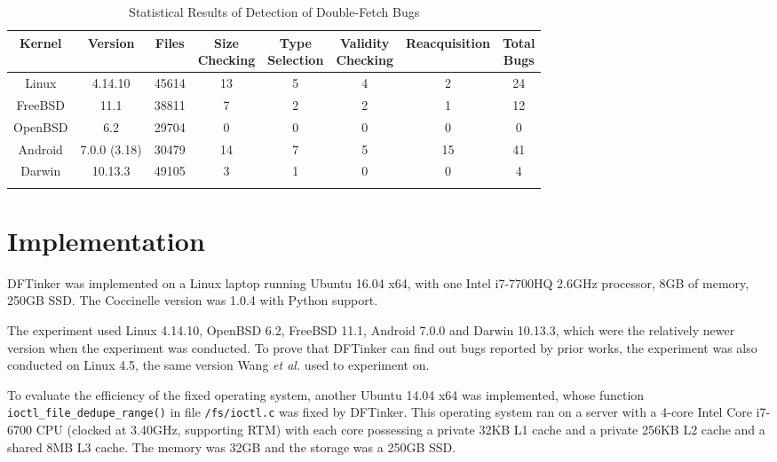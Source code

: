 \documentclass[10pt]{llncs}
\begin{document}
\begin{table}[t]
  \centering
  \caption{Statistical Results of Detection of Double-Fetch Bugs}
  \begin{tabular}{cccccccc}
    \hline
    Kernel & Version & Files & \makecell{Size \\ Checking} & \makecell{Type \\ Selection} & \makecell{Validity \\ Checking} & Reacquisition & \makecell{Total \\ Bugs}\\    
    \hline
    Linux & 4.14.10 & 45614 & 13 & 5 & 4 & 2 & 24 \\
    FreeBSD & 11.1 & 38811 & 7 & 2 & 2 & 1 & 12 \\
    OpenBSD & 6.2 & 29704 & 0 & 0 & 0 & 0 & 0 \\
    Android & 7.0.0 (3.18) & 30479 & 14 & 7 & 5 & 15 & 41 \\
    Darwin & 10.13.3 & 49105 & 3 & 1 & 0 & 0 & 4 \\
    \hline
    \label{stat}
  \end{tabular}
\end{table}




\section{Implementation}%
\label{imple}
DFTinker was implemented on a Linux laptop running Ubuntu 16.04 x64, with one Intel i7-7700HQ 2.6GHz processor, 8GB of memory, 250GB SSD. The Coccinelle version was 1.0.4 with Python support.

The experiment used Linux 4.14.10, OpenBSD 6.2, FreeBSD 11.1, Android 7.0.0 and Darwin 10.13.3, which were the relatively newer version when the experiment was conducted. To prove that DFTinker can find out bugs reported by prior works, the experiment was also conducted on Linux 4.5, the same version Wang \textit{et al.} used to experiment on.

To evaluate the efficiency of the fixed operating system, another Ubuntu 14.04 x64 was implemented, whose function \verb:ioctl_file_dedupe_range(): in file \texttt{/fs/ioctl.c} was fixed by DFTinker. This operating system ran on a server with a 4-core Intel Core i7-6700 CPU (clocked at 3.40GHz, supporting RTM) with each core possessing a private 32KB L1 cache and a private 256KB L2 cache and a shared 8MB L3 cache. The memory was 32GB and the storage was a 250GB SSD.
\end{document}
